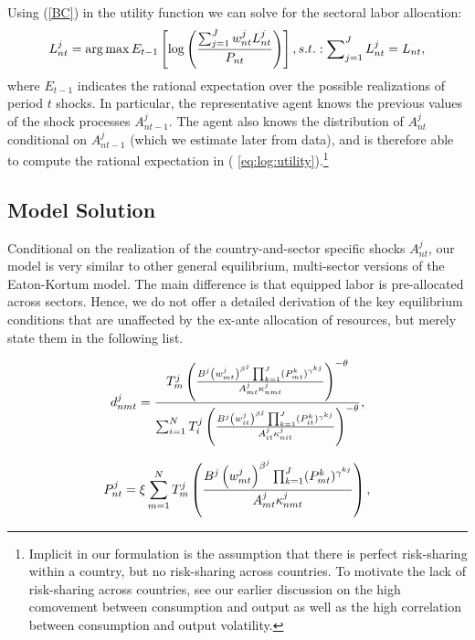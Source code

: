 \documentclass[12pt]{article}
\begin{document}
Using (\ref{BC}) in the utility function we can solve for the sectoral labor
allocation:%
\begin{equation}
L_{nt}^{j}=\arg \max E_{t-1}\left[ \log \left( \frac{%
\sum_{j=1}^{J}w_{nt}^{j}L_{nt}^{j}}{P_{nt}}\right) \right]
,s.t.:\sum\nolimits_{j=1}^{J}L_{nt}^{j}=L_{nt},  \label{eq:log:utility}
\end{equation}%
where $E_{t-1}$ indicates the rational expectation over
the possible realizations of period $t$ shocks. In particular, the
representative agent knows the previous values of the shock processes $%
A_{nt-1}^{j}$. The agent also knows the distribution of $A_{nt}^{j}$%
 conditional on $A_{nt-1}^{j}$ (which we estimate later
from data), and is therefore able to compute the rational expectation in (%
\ref{eq:log:utility}).\footnote{%
Implicit in our formulation is the assumption that there is perfect
risk-sharing within a country, but no risk-sharing across countries. To
motivate the lack of risk-sharing across countries, see our earlier
discussion on the high comovement between consumption and output as well as
the high correlation between consumption and output volatility.}

\subsection{Model Solution}

Conditional on the realization of the country-and-sector specific shocks $%
A_{nt}^{j}$, our model is very similar to other general equilibrium,
multi-sector versions of the Eaton-Kortum model. The main difference is that
equipped labor is pre-allocated across sectors. Hence, we do not offer a
detailed derivation of the key equilibrium conditions that are unaffected by
the ex-ante allocation of resources, but merely state them in the following
list.

\begin{equation}
d_{nmt}^{j}=\frac{T_{m}^{j}\left( \frac{B^{j}\left( w_{mt}^{j}\right)
^{\beta ^{j}}\prod_{k=1}^{J}(P_{mt}^{k})^{\gamma ^{kj}}}{A_{mt}^{j}\kappa
_{nmt}^{j}}\right) ^{-\theta }} {\sum_{i=1}^{N}T_{i}^{j}\left( \frac{%
B^{j}\left( w_{it}^{j}\right) ^{\beta
^{j}}\prod_{k=1}^{J}(P_{it}^{k})^{\gamma ^{kj}}}{A_{it}^{j}\kappa _{nit}^{j}}%
\right) ^{-\theta }},  \label{shares}
\end{equation}

\begin{equation}
P_{nt}^{j}=\xi \sum_{m=1}^{N}T_{m}^{j}\left( \frac{B^{j}\left(
w_{mt}^{j}\right) ^{\beta ^{j}}\prod_{k=1}^{J}(P_{mt}^{k})^{\gamma ^{kj}}}{%
A_{mt}^{j}\kappa _{nmt}^{j}}\right) ,  \label{eq2}
\end{equation}
\end{document}
